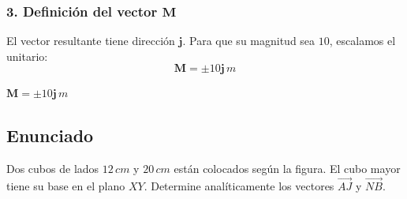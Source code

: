 \documentclass[12pt, a4paper]{article}
\begin{document}
\subsubsection*{3. Definición del vector $\mathbf{M}$}
El vector resultante tiene dirección $\mathbf{j}$. Para que su magnitud sea $10$, escalamos el unitario:
\begin{equation*}
    \mathbf{M} = \pm 10\mathbf{j} \, \si{m}
\end{equation*}

\begin{tcolorbox}[colback=green!5, colframe=green!50!black, title=Respuesta Final]
\centering \Large $\mathbf{M} = \pm 10\mathbf{j} \, \si{m}$
\end{tcolorbox}

\newpage

\subsection*{Enunciado}
Dos cubos de lados $12\,\si{cm}$ y $20\,\si{cm}$ están colocados según la figura. El cubo mayor tiene su base en el plano $XY$. Determine analíticamente los vectores $\vec{AJ}$ y $\vec{NB}$.
\end{document}
